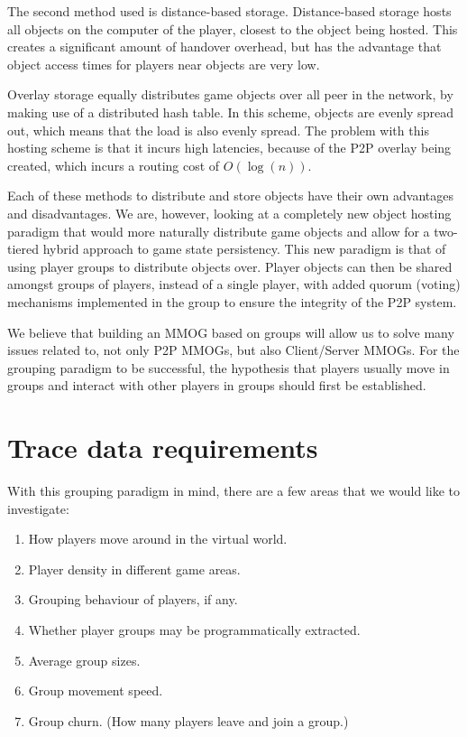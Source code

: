 \documentclass[journal,oneside,a4paper,onecolumn]{IEEEtran}
\begin{document}
The second method used is distance-based storage. Distance-based storage hosts all objects on the computer of the player, closest to the object being
hosted. This creates a significant amount of handover overhead, but has the advantage that object access times for players near objects are very low.

Overlay storage equally distributes game objects over all peer in the network, by making use of a distributed hash table. In this scheme, objects are
evenly spread out, which means that the load is also evenly spread. The problem with this hosting scheme is that it incurs high latencies, because of
the P2P overlay being created, which incurs a routing cost of $O(\log(n))$.

Each of these methods to distribute and store objects have their own advantages and disadvantages. We are, however, looking at a completely new
object hosting paradigm that would more naturally distribute game objects and allow for a two-tiered hybrid approach to game state persistency. This
new paradigm is that of using player groups to distribute objects over. Player objects can then be shared amongst groups of players, instead of a
single player, with added quorum (voting) mechanisms implemented in the group to ensure the integrity of the P2P system.

We believe that building an MMOG based on groups will allow us to solve many issues related to, not only P2P MMOGs, but also Client/Server MMOGs. For
the grouping paradigm to be successful, the hypothesis that players usually move in groups and interact with other players in groups should first be
established.

\section{Trace data requirements}

With this grouping paradigm in mind, there are a few areas that we would like to investigate:
\begin{enumerate}
\item How players move around in the virtual world.
\item Player density in different game areas.
\item Grouping behaviour of players, if any.
\item Whether player groups may be programmatically extracted.
\item Average group sizes.
\item Group movement speed.
\item Group churn. (How many players leave and join a group.)
\end{enumerate}
\end{document}

